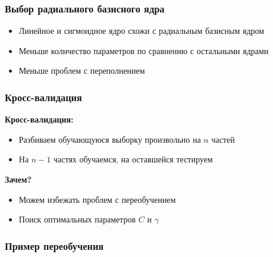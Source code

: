\begin{frame}
\frametitle{Выбор радиального базисного ядра}
	\begin{itemize}
		\item Линейное и сигмоидное ядро схожи с радиальным базисным ядром
		\item Меньше количество параметров по сравнению с остальными ядрами
		\item Меньше проблем с переполнением
	\end{itemize}
\end{frame}


\begin{frame}
\frametitle{Кросс-валидация}

	\textbf{Кросс-валидация:}
	\begin{itemize}
		\item Разбиваем обучающуюся выборку произвольно на $n$ частей
		\item На $n - 1$ частях обучаемся, на оставшейся тестируем		
	\end{itemize}

	\textbf{Зачем?}
	\begin{itemize}
		\item Можем избежать проблем с переобучением
		\item Поиск оптимальных параметров $C$ и $\gamma$
	\end{itemize}
\end{frame}


\begin{frame}
\frametitle{Пример переобучения}
	\begin{figure}[h]
	\end{figure}
\end{frame}

